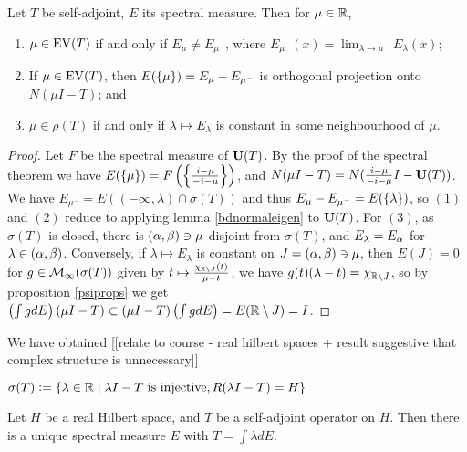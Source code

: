 \documentclass[10pt]{amsart}
\begin{document}
\begin{theorem}
    Let $T$ be self-adjoint, $E$ its spectral measure. Then for $\mu \in \mathbb{R}$,
    \begin{enumerate}
        \item $\mu \in \operatorname{EV}(T)$ if and only if $E_\mu \neq E_{\mu^-}$, where $E_{\mu^-}(x) = \lim_{\lambda \to \mu^-}E_\lambda(x)$;
        \item If $\mu \in \operatorname{EV}(T)$, then $E(\left\{  \mu  \right\}) = E_\mu - E_{\mu^-}$ is orthogonal projection onto $N(\mu I - T)$; and
        \item $\mu \in \rho(T)$ if and only if $\lambda \mapsto E_\lambda$ is constant in some neighbourhood of $\mu$.
    \end{enumerate}
\end{theorem}
\begin{proof}
    Let $F$ be the spectral measure of $\mathbf{U}(T)$. By the proof of the spectral theorem we have $E(\left\{  \mu  \right\}) = F\left(  \left\{  \frac{i - \mu}{-i - \mu}  \right\}  \right)$, and $N(\mu I - T) = N(\frac{i - \mu}{-i - \mu}I - \mathbf{U}(T))$. We have $E_{\mu^-} = E((-\infty, \lambda) \cap \sigma(T))$ and thus $E_{\mu} - E_{\mu^-} = E(\left\{  \lambda  \right\})$, so $(1)$ and $(2)$ reduce to applying lemma \ref{bdnormaleigen} to $\mathbf{U}(T)$. For $(3)$, as $\sigma(T)$ is closed, there is $(\alpha, \beta) \ni \mu$ disjoint from $\sigma(T)$, and $E_\lambda = E_\alpha$ for $\lambda \in (\alpha, \beta)$. Conversely, if $\lambda \mapsto E_\lambda$ is constant on $J = (\alpha, \beta) \ni \mu$, then $E(J) = 0$ for $g \in \mathcal{M}_\infty(\sigma(T))$ given by $t \mapsto \frac{\chi_{\mathbb{R} \setminus J}(t)}{\mu - t}$, we have $g(t)(\lambda - t) = \chi_{\mathbb{R} \setminus J}$, so by proposition \ref{psiprops} we get $\left(  \int g dE  \right)(\mu I - T) \subset (\mu I - T)\left(  \int g dE  \right) = E(\mathbb{R} \setminus J) = I$.
\end{proof}
We have obtained [[relate to course - real hilbert spaces + result suggestive that complex structure is unnecessary]]
\begin{definition}
    $\sigma(T) \vcentcolon= \left\{  \lambda \in \mathbb{R} \mid \lambda I - T \text{ is injective}, R(\lambda I - T) = H  \right\}$
\end{definition}
\begin{theorem}
    Let $H$ be a real Hilbert space, and $T$ be a self-adjoint operator on $H$. Then there is a unique spectral measure $E$ with $T = \int \lambda dE$.
\end{theorem}
\end{document}
